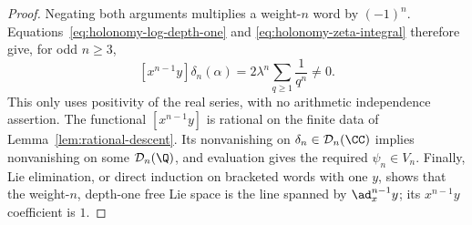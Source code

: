 \begin{proof}
Negating both arguments multiplies a weight-$n$ word by $(-1)^n$.
Equations~\eqref{eq:holonomy-log-depth-one} and
\eqref{eq:holonomy-zeta-integral} therefore give, for odd $n\geq3$,
\begin{equation}\label{eq:holonomy-nonzero-odd}
 [x^{n-1}y]\delta_n(\alpha)
 =2\lambda^n\sum_{q\geq1}\frac1{q^n}\ne0.
\end{equation}
This only uses positivity of the real series, with no arithmetic
independence assertion.  The functional $[x^{n-1}y]$ is rational on
the finite data of Lemma~\ref{lem:rational-descent}.  Its nonvanishing
on $\delta_n\in\mathcal D_n(\CC)$ implies nonvanishing on some
$\mathcal D_n(\Q)$, and evaluation gives the required $\psi_n\in V_n$.
Finally, Lie elimination, or direct induction on bracketed words with
one $y$, shows that the weight-$n$, depth-one free Lie space is the
line spanned by $\ad_x^{n-1}y$; its $x^{n-1}y$ coefficient is $1$.
\end{proof}
